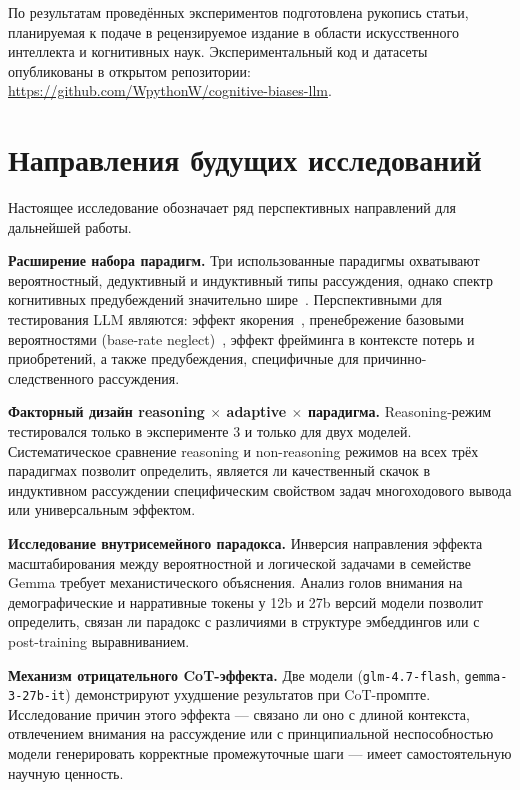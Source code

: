 По результатам проведённых экспериментов подготовлена рукопись статьи, планируемая к подаче в рецензируемое издание в области искусственного интеллекта и когнитивных наук. Экспериментальный код и датасеты опубликованы в открытом репозитории: \url{https://github.com/WpythonW/cognitive-biases-llm}.

\section{Направления будущих исследований}

Настоящее исследование обозначает ряд перспективных направлений для дальнейшей работы.

\textbf{Расширение набора парадигм.} Три использованные парадигмы охватывают вероятностный, дедуктивный и индуктивный типы рассуждения, однако спектр когнитивных предубеждений значительно шире~\cite{kahneman2011thinking}. Перспективными для тестирования LLM являются: эффект якорения~\cite{tversky1981framing}, пренебрежение базовыми вероятностями (base-rate neglect)~\cite{tversky1983extensional}, эффект фрейминга в контексте потерь и приобретений, а также предубеждения, специфичные для причинно-следственного рассуждения.

\textbf{Факторный дизайн reasoning $\times$ adaptive $\times$ парадигма.} Reasoning-режим тестировался только в эксперименте 3 и только для двух моделей. Систематическое сравнение reasoning и non-reasoning режимов на всех трёх парадигмах позволит определить, является ли качественный скачок в индуктивном рассуждении специфическим свойством задач многоходового вывода или универсальным эффектом.

\textbf{Исследование внутрисемейного парадокса.} Инверсия направления эффекта масштабирования между вероятностной и логической задачами в семействе Gemma требует механистического объяснения. Анализ голов внимания на демографические и нарративные токены у 12b и 27b версий модели позволит определить, связан ли парадокс с различиями в структуре эмбеддингов или с post-training выравниванием.

\textbf{Механизм отрицательного CoT-эффекта.} Две модели (\texttt{glm-4.7-flash}, \texttt{gemma-3-27b-it}) демонстрируют ухудшение результатов при CoT-промпте. Исследование причин этого эффекта --- связано ли оно с длиной контекста, отвлечением внимания на рассуждение или с принципиальной неспособностью модели генерировать корректные промежуточные шаги --- имеет самостоятельную научную ценность.

